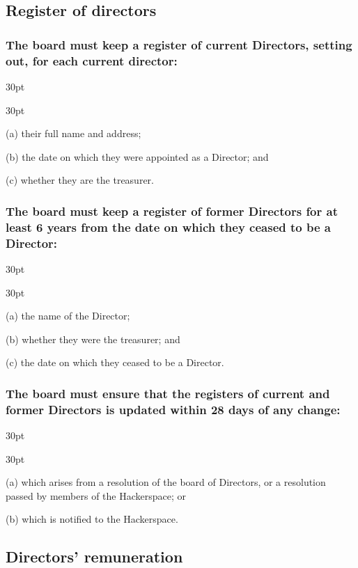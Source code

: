 \documentclass[12pt]{article}
\def\clauseindent{30pt}
\newenvironment{subindentlist}{\begin{adjustwidth}{\clauseindent}{}\begin{labeledlist}{\clauseindent}}{\end{labeledlist}\end{adjustwidth}}
\begin{document}
\subsection{Register of directors}
\subsubsection[Register of current Directors]{The board must keep a register of current Directors, setting out, for each current director:}
\begin{subindentlist}
    \item [(a)] their full name and address;
    \item [(b)] the date on which they were appointed as a Director; and
    \item [(c)] whether they are the treasurer.
\end{subindentlist}
\subsubsection[Register of former Directors]{The board must keep a register of former Directors for at least 6 years from the date on which they ceased to be a Director:}
\begin{subindentlist}
    \item [(a)] the name of the Director;
    \item [(b)] whether they were the treasurer; and
    \item [(c)] the date on which they ceased to be a Director.
\end{subindentlist}
\subsubsection[Company must keep registers of Directors up to date]{The board must ensure that the registers of current and former Directors is updated within 28 days of any change:}
\begin{subindentlist}
    \item [(a)] which arises from a resolution of the board of Directors, or a resolution passed by members of the Hackerspace; or
    \item [(b)] which is notified to the Hackerspace.
\end{subindentlist}

\subsection{Directors' remuneration}
\end{document}
